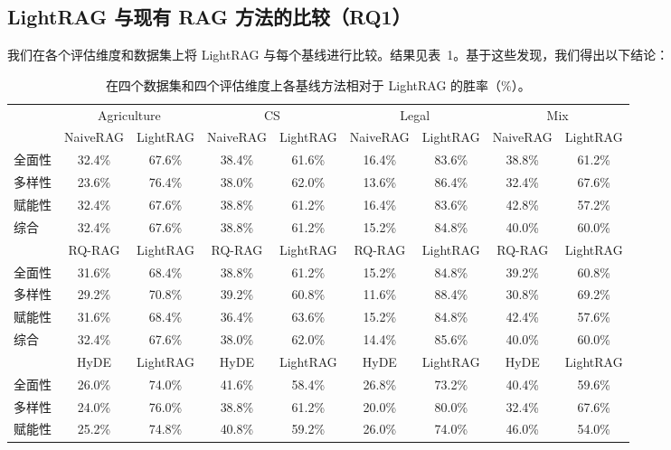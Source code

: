 \documentclass[11pt,UTF8,fontset=fandol]{ctexart}
\begin{document}
\subsection{LightRAG 与现有 RAG 方法的比较（RQ1）}

我们在各个评估维度和数据集上将 LightRAG 与每个基线进行比较。结果见表~1。基于这些发现，我们得出以下结论：

\begin{table}[H]\centering
\caption{在四个数据集和四个评估维度上各基线方法相对于 LightRAG 的胜率（\%）。}
\label{tab:1}
\small
\setlength{\tabcolsep}{4pt}
\begin{tabular}{lcccccccc}
\toprule
& \multicolumn{2}{c}{Agriculture} & \multicolumn{2}{c}{CS} & \multicolumn{2}{c}{Legal} & \multicolumn{2}{c}{Mix} \\
\cmidrule(lr){2-3}\cmidrule(lr){4-5}\cmidrule(lr){6-7}\cmidrule(lr){8-9}
& NaiveRAG & LightRAG & NaiveRAG & LightRAG & NaiveRAG & LightRAG & NaiveRAG & LightRAG \\
\midrule
全面性 & 32.4\% & 67.6\% & 38.4\% & 61.6\% & 16.4\% & 83.6\% & 38.8\% & 61.2\% \\
多样性 & 23.6\% & 76.4\% & 38.0\% & 62.0\% & 13.6\% & 86.4\% & 32.4\% & 67.6\% \\
赋能性 & 32.4\% & 67.6\% & 38.8\% & 61.2\% & 16.4\% & 83.6\% & 42.8\% & 57.2\% \\
综合 & 32.4\% & 67.6\% & 38.8\% & 61.2\% & 15.2\% & 84.8\% & 40.0\% & 60.0\% \\
\midrule
& RQ-RAG & LightRAG & RQ-RAG & LightRAG & RQ-RAG & LightRAG & RQ-RAG & LightRAG \\
\midrule
全面性 & 31.6\% & 68.4\% & 38.8\% & 61.2\% & 15.2\% & 84.8\% & 39.2\% & 60.8\% \\
多样性 & 29.2\% & 70.8\% & 39.2\% & 60.8\% & 11.6\% & 88.4\% & 30.8\% & 69.2\% \\
赋能性 & 31.6\% & 68.4\% & 36.4\% & 63.6\% & 15.2\% & 84.8\% & 42.4\% & 57.6\% \\
综合 & 32.4\% & 67.6\% & 38.0\% & 62.0\% & 14.4\% & 85.6\% & 40.0\% & 60.0\% \\
\midrule
& HyDE & LightRAG & HyDE & LightRAG & HyDE & LightRAG & HyDE & LightRAG \\
\midrule
全面性 & 26.0\% & 74.0\% & 41.6\% & 58.4\% & 26.8\% & 73.2\% & 40.4\% & 59.6\% \\
多样性 & 24.0\% & 76.0\% & 38.8\% & 61.2\% & 20.0\% & 80.0\% & 32.4\% & 67.6\% \\
赋能性 & 25.2\% & 74.8\% & 40.8\% & 59.2\% & 26.0\% & 74.0\% & 46.0\% & 54.0\% \\

\end{tabular}
\end{table}
\end{document}
